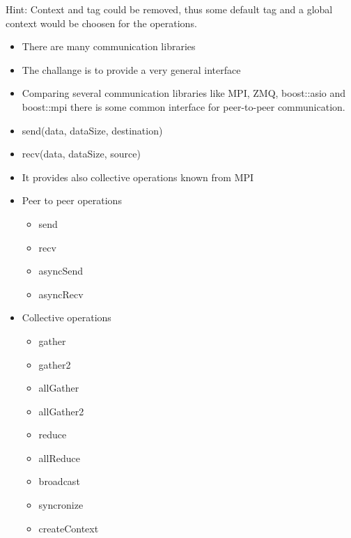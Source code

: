 Hint: Context and tag could be removed, thus some default tag and a global
      context would be choosen for the operations.



\begin{itemize}
\item There are many communication libraries
\item The challange is to provide a very general interface
\item Comparing several communication libraries like MPI, ZMQ, boost::asio and boost::mpi
  there is some common interface for peer-to-peer communication.
\item send(data, dataSize, destination)
\item recv(data, dataSize, source)
\item It provides also collective operations known from MPI
\end{itemize}

\begin{itemize}
\item Peer to peer operations
  \begin{itemize}
  \item send
  \item recv
  \item asyncSend
  \item asyncRecv
  \end{itemize}
\end{itemize}

\begin{itemize}
\item Collective operations
  \begin{itemize}
    \item gather
    \item gather2
    \item allGather
    \item allGather2
    \item reduce
    \item allReduce
    \item broadcast
    \item syncronize
    \item createContext
  \end{itemize}

\end{itemize}

